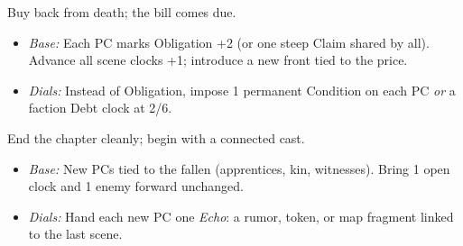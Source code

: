 \begin{description}[leftmargin=1.6em]
\item[Reprieve at a Price.] Buy back from death; the bill comes due.
\begin{itemize}
\item \emph{Base:} Each PC marks Obligation +2 (or one steep Claim shared by all). Advance all scene clocks +1; introduce a new front tied to the price.
\item \emph{Dials:} Instead of Obligation, impose 1 permanent Condition on each PC \emph{or} a faction Debt clock at 2/6.
\end{itemize}

\item[New Torchbearers.] End the chapter cleanly; begin with a connected cast.
\begin{itemize}
\item \emph{Base:} New PCs tied to the fallen (apprentices, kin, witnesses). Bring 1 open clock and 1 enemy forward unchanged.
\item \emph{Dials:} Hand each new PC one \emph{Echo}: a rumor, token, or map fragment linked to the last scene.
\end{itemize}
\end{description}

